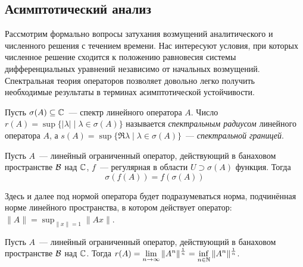 \subsection{Асимптотический анализ}
\label{subsection:linear_stability_theory:asymptotic}

Рассмотрим формально вопросы затухания возмущений аналитического и численного решения с течением времени.
Нас интересуют условия, при которых численное решение сходится к положению равновесия системы дифференциальных уравнений
независимо от начальных возмущений.
Спектральная теория операторов позволяет довольно легко получить необходимые результаты
в терминах асимптотической устойчивости.

\begin{definition}
    \label{definition:asymptotic:spectral_radius_and_abscissa}
    Пусть $ \sigma(A) \subseteq \mathbb{C} $~--- спектр линейного оператора $ A $.
    Число $ \displaystyle r(A) = \sup \{|\lambda| \mid \lambda \in \sigma(A) \} $ называется \emph{спектральным радиусом} линейного оператора $ A $,
    а $ \displaystyle s(A) = \sup \{\Re \lambda \mid \lambda \in \sigma(A) \} $~--- \emph{спектральной границей}.
\end{definition}

\begin{theorem}
    \label{theorem:asymptotic:spectral_mapping_theorem}
    Пусть $ A $~--- линейный ограниченный оператор, действующий в банаховом пространстве $ \mathcal{B} $ над $ \mathbb{C} $,
    $ f $~--- регулярная в области $ U \supset \sigma(A) $ функция.
    Тогда
    \begin{equation}
        \label{eq:asymptotic:spectral_mapping_theorem}
        \sigma(f(A)) = f(\sigma(A))
    \end{equation}
\end{theorem}

Здесь и далее под нормой оператора будет подразумеваться норма,
подчинённая норме линейного пространства,
в котором действует оператор: $\displaystyle \| A \| = \sup_{\| x \| = 1} \| A x \| $.

\begin{theorem}
    \label{theorem:asymptotic:Beurling-Gelfand_formula}
    Пусть $ A $~--- линейный ограниченный оператор, действующий в банаховом пространстве $ \mathcal{B} $ над $ \mathbb{C} $.
    Тогда $ \displaystyle r(A) = \lim_{n \to \infty} \| A^n \|^{\frac{1}{n}} = \inf_{n \in \mathbb{N}} \| A^n \|^{\frac{1}{n}} $.
\end{theorem}

